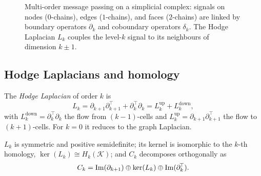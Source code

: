 \begin{figure}[ht]
\caption[Simplicial hierarchy]{Multi-order message passing on a simplicial
complex: signals on nodes ($0$-chains), edges ($1$-chains), and faces
($2$-chains) are linked by boundary operators $\partial_k$ and coboundary
operators $\delta_k$. The Hodge Laplacian $L_k$ couples the level-$k$ signal to
its neighbours of dimension $k \pm 1$.}
\label{fig:gauge:simplicial-hierarchy}
\end{figure}

\subsection{Hodge Laplacians and homology}
\label{sec:gauge:hodge}

\begin{definition}
\label{def:gauge:hodge-laplacian}
The \emph{Hodge Laplacian} of order $k$ is
\[
  L_k = \partial_{k+1}\partial_{k+1}^{\!\top} + \partial_k^{\!\top}\partial_k
      = L_k^{\text{up}} + L_k^{\text{down}},
\]
with $L_k^{\text{down}} = \partial_k^{\!\top}\partial_k$ the flow from
$(k-1)$-cells and $L_k^{\text{up}} = \partial_{k+1}\partial_{k+1}^{\!\top}$ the
flow to $(k+1)$-cells. For $k = 0$ it reduces to the graph Laplacian.
\end{definition}

\begin{theorem}
\label{thm:gauge:hodge-props}
$L_k$ is symmetric and positive semidefinite; its kernel is isomorphic to the
$k$-th homology, $\ker(L_k) \cong H_k(\mathcal{K})$; and $C_k$ decomposes
orthogonally as
\[
  C_k = \operatorname{Im}(\partial_{k+1}) \oplus \ker(L_k) \oplus \operatorname{Im}(\partial_k^{\!\top}).
\]
\end{theorem}

